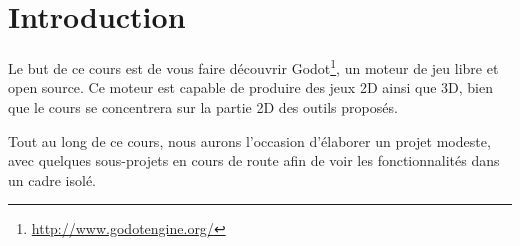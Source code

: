 \chapter*{Introduction}

Le but de ce cours est de vous faire découvrir Godot\footnote{\url{http://www.godotengine.org/}}, un moteur de jeu libre et open source. Ce moteur est capable de produire des jeux 2D ainsi que 3D, bien que le cours se concentrera sur la partie 2D des outils proposés.

Tout au long de ce cours, nous aurons l'occasion d'élaborer un projet modeste, avec quelques sous-projets en cours de route afin de voir les fonctionnalités dans un cadre isolé.
